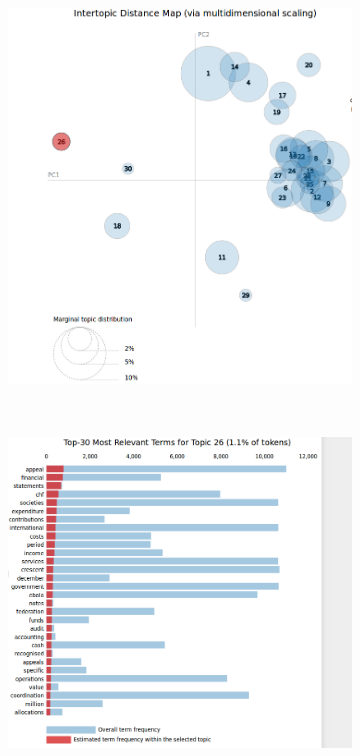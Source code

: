 \begin{figure}[h!]
    \centering
    \begin{subfigure}[h]{0.60\textwidth}
        \includegraphics[width=\textwidth]{c4_5.png}
        \label{fig:trapez1}
    \end{subfigure}
    ~ %
    \begin{subfigure}[h]{0.60\textwidth}
        \includegraphics[width=\textwidth]{c4_6.png}

\end{subfigure}
\end{figure}
